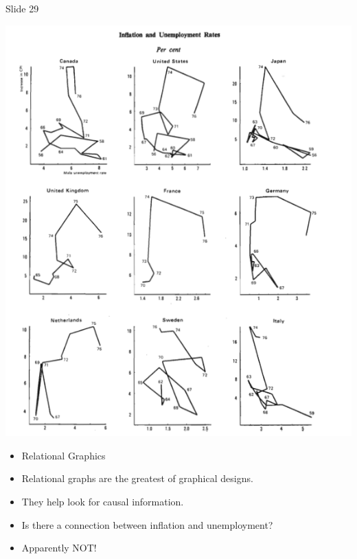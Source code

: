 \documentclass[
  ignorenonframetext,
]{beamer}
\begin{document}
\begin{frame}{Slide 29}
\protect\hypertarget{slide-29}{}
\begin{minipage}{0.45\textwidth}
\centering
\includegraphics[width=\textwidth]{excellence_figs/fig_26.png}
\end{minipage}
\hfill
\begin{minipage}{0.5\textwidth}
\footnotesize
\begin{itemize}
  \item Relational Graphics
  \item Relational graphs are the greatest of graphical designs.
  \item They help look for causal information.
  \item Is there a connection between inflation and unemployment?
  \item Apparently NOT!
\end{itemize}
\end{minipage}
\end{frame}
\end{document}
